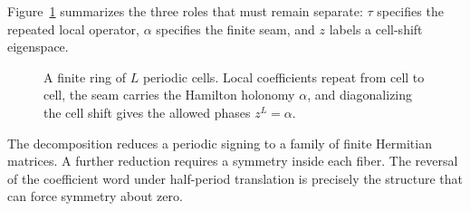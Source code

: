 Figure~\ref{fig:finite-bloch} summarizes the three roles that must remain
separate: $\tau$ specifies the repeated local operator, $\alpha$ specifies the
finite seam, and $z$ labels a cell-shift eigenspace.

\begin{figure}[t]
 \centering
 
 \caption{A finite ring of $L$ periodic cells.  Local coefficients repeat from
 cell to cell, the seam carries the Hamilton holonomy $\alpha$, and
 diagonalizing the cell shift gives the allowed phases $z^L=\alpha$.}
 \label{fig:finite-bloch}
\end{figure}

The decomposition reduces a periodic signing to a family of finite Hermitian
matrices.  A further reduction requires a symmetry inside each fiber.  The
reversal of the coefficient word under half-period translation is precisely
the structure that can force symmetry about zero.
